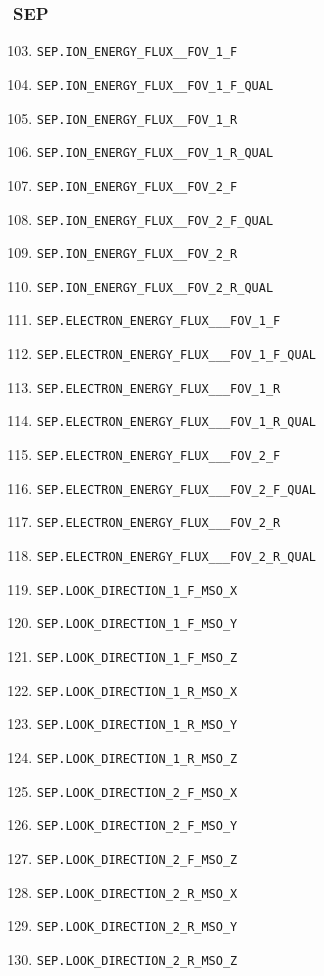 \documentclass{article}
\begin{document}
\subsubsection{SEP}
\begin{enumerate}
\setcounter{enumi}{102}
    \item \texttt{SEP.ION\_ENERGY\_FLUX\_\_FOV\_1\_F}
    \item \texttt{SEP.ION\_ENERGY\_FLUX\_\_FOV\_1\_F\_QUAL}
    \item \texttt{SEP.ION\_ENERGY\_FLUX\_\_FOV\_1\_R}
    \item \texttt{SEP.ION\_ENERGY\_FLUX\_\_FOV\_1\_R\_QUAL}
    \item \texttt{SEP.ION\_ENERGY\_FLUX\_\_FOV\_2\_F}
    \item \texttt{SEP.ION\_ENERGY\_FLUX\_\_FOV\_2\_F\_QUAL}
    \item \texttt{SEP.ION\_ENERGY\_FLUX\_\_FOV\_2\_R}
    \item \texttt{SEP.ION\_ENERGY\_FLUX\_\_FOV\_2\_R\_QUAL}
    \item \texttt{SEP.ELECTRON\_ENERGY\_FLUX\_\_\_FOV\_1\_F}
    \item \texttt{SEP.ELECTRON\_ENERGY\_FLUX\_\_\_FOV\_1\_F\_QUAL}
    \item \texttt{SEP.ELECTRON\_ENERGY\_FLUX\_\_\_FOV\_1\_R}
    \item \texttt{SEP.ELECTRON\_ENERGY\_FLUX\_\_\_FOV\_1\_R\_QUAL}
    \item \texttt{SEP.ELECTRON\_ENERGY\_FLUX\_\_\_FOV\_2\_F}
    \item \texttt{SEP.ELECTRON\_ENERGY\_FLUX\_\_\_FOV\_2\_F\_QUAL}
    \item \texttt{SEP.ELECTRON\_ENERGY\_FLUX\_\_\_FOV\_2\_R}
    \item \texttt{SEP.ELECTRON\_ENERGY\_FLUX\_\_\_FOV\_2\_R\_QUAL}
    \item \texttt{SEP.LOOK\_DIRECTION\_1\_F\_MSO\_X}
    \item \texttt{SEP.LOOK\_DIRECTION\_1\_F\_MSO\_Y}
    \item \texttt{SEP.LOOK\_DIRECTION\_1\_F\_MSO\_Z}
    \item \texttt{SEP.LOOK\_DIRECTION\_1\_R\_MSO\_X}
    \item \texttt{SEP.LOOK\_DIRECTION\_1\_R\_MSO\_Y}
    \item \texttt{SEP.LOOK\_DIRECTION\_1\_R\_MSO\_Z}
    \item \texttt{SEP.LOOK\_DIRECTION\_2\_F\_MSO\_X}
    \item \texttt{SEP.LOOK\_DIRECTION\_2\_F\_MSO\_Y}
    \item \texttt{SEP.LOOK\_DIRECTION\_2\_F\_MSO\_Z}
    \item \texttt{SEP.LOOK\_DIRECTION\_2\_R\_MSO\_X}
    \item \texttt{SEP.LOOK\_DIRECTION\_2\_R\_MSO\_Y}
    \item \texttt{SEP.LOOK\_DIRECTION\_2\_R\_MSO\_Z}
\end{enumerate}
\end{document}
